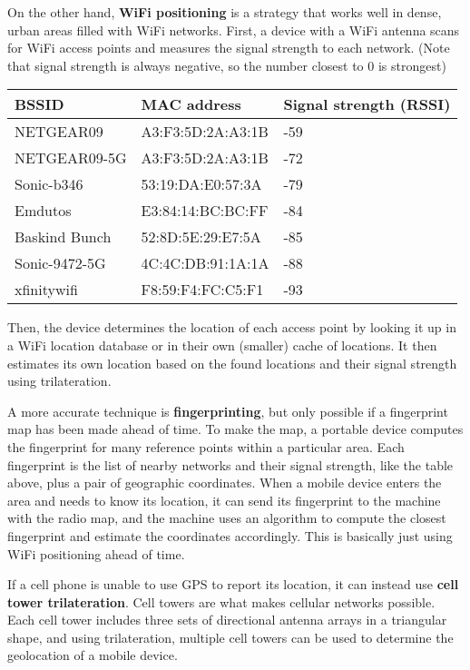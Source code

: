 \documentclass[a4paper, 12pt]{report}
\theoremstyle{remark}
\theoremstyle{definition}
\begin{document}
On the other hand, \textbf{WiFi positioning} is a strategy that works well in dense, urban areas filled with WiFi networks. First, a device with a WiFi antenna scans for WiFi access points and measures the signal strength to each network. (Note that signal strength is always negative, so the number closest to 0 is strongest)
\begin{center}
\begin{tabular}{l|l|l}
    BSSID & MAC address & Signal strength (RSSI) \\
    \hline
    NETGEAR09 & A3:F3:5D:2A:A3:1B & -59 \\
    NETGEAR09-5G & A3:F3:5D:2A:A3:1B & -72 \\
    Sonic-b346 & 53:19:DA:E0:57:3A & -79 \\
    Emdutos & E3:84:14:BC:BC:FF & -84 \\
    Baskind Bunch & 52:8D:5E:29:E7:5A & -85 \\
    Sonic-9472-5G & 4C:4C:DB:91:1A:1A & -88 \\
    xfinitywifi & F8:59:F4:FC:C5:F1	& -93
\end{tabular}
\end{center}
Then, the device determines the location of each access point by looking it up in a WiFi location database or in their own (smaller) cache of locations. It then estimates its own location based on the found locations and their signal strength using trilateration. 

A more accurate technique is \textbf{fingerprinting}, but only possible if a fingerprint map has been made ahead of time. To make the map, a portable device computes the fingerprint for many reference points within a particular area. Each fingerprint is the list of nearby networks and their signal strength, like the table above, plus a pair of geographic coordinates. When a mobile device enters the area and needs to know its location, it can send its fingerprint to the machine with the radio map, and the machine uses an algorithm to compute the closest fingerprint and estimate the coordinates accordingly. This is basically just using WiFi positioning ahead of time. 

If a cell phone is unable to use GPS to report its location, it can instead use \textbf{cell tower trilateration}. Cell towers are what makes cellular networks possible. Each cell tower includes three sets of directional antenna arrays in a triangular shape, and using trilateration, multiple cell towers can be used to determine the geolocation of a mobile device. 
\end{document}
